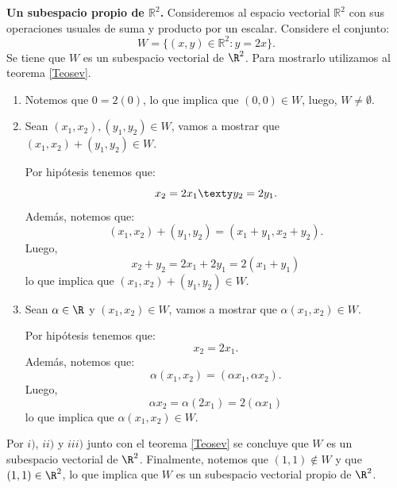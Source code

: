 \documentclass[compacto,10pt]{pubciencias-notas}
\begin{document}
\begin{ejem}\label{Ejsev}\hspace{0pt} \textbf{Un subespacio propio de $\mathbb{R}^{2}$.} Consideremos al espacio vectorial $\mathbb{R}^{2}$ con sus operaciones usuales de suma y producto por un escalar. Considere el conjunto:
\[
    W= \{(x,y)\in \mathbb{R}^{2} : y=2x \}.
\]
Se tiene que $W$ es un subespacio vectorial de $\R^{2}$. Para mostrarlo utilizamos al teorema \ref{Teosev}.
\begin{enumerate}
\item[$i)$] Notemos que $0 = 2(0)$, lo que implica que $(0,0)\in W$, luego, $W\neq\emptyset$.
\item[$ii)$] Sean $(x_{1},x_{2}), (y_{1}, y_{2})\in W$, vamos a mostrar que $(x_{1},x_{2}) + (y_{1}, y_{2})\in W$.

Por hipótesis tenemos que: 
\[
    x_{2} = 2x_{1} \texty y_{2} = 2y_{1}.
\]
Además, notemos que:
\[
    (x_{1},x_{2}) + (y_{1}, y_{2}) = (x_{1} + y_{1}, x_{2} + y_{2}).
\]
Luego, 
\[
    x_{2} + y_{2} = 2x_{1} + 2y_{1} = 2(x_{1} + y_{1})
\]
lo que implica que $(x_{1},x_{2})+(y_{1}, y_{2})\in W$.
\item[$iii)$] Sean $\alpha\in\R$ y $(x_{1},x_{2})\in W$, vamos a mostrar que $\alpha(x_{1},x_{2})\in W$.

Por hipótesis tenemos que: 
\[
    x_{2} = 2x_{1}.
\]
Además, notemos que: 
\[
    \alpha(x_{1},x_{2}) = (\alpha x_{1}, \alpha x_{2}).
\]
Luego, 
\[
    \alpha x_{2}  = \alpha(2x_{1}) = 2(\alpha x_{1})
\]
lo que implica que $\alpha (x_{1},x_{2})\in W$.
\end{enumerate}
Por $i)$, $ii)$ y $iii)$ junto con el teorema \ref{Teosev} se concluye que $W$ es un subespacio vectorial de $\R^{2}$. Finalmente, notemos que $(1,1)\notin W$ y que $(1,1)\in\R^{2}$, lo que implica que $W$ es un subespacio vectorial propio de $\R^{2}$.

\end{ejem}
\end{document}
